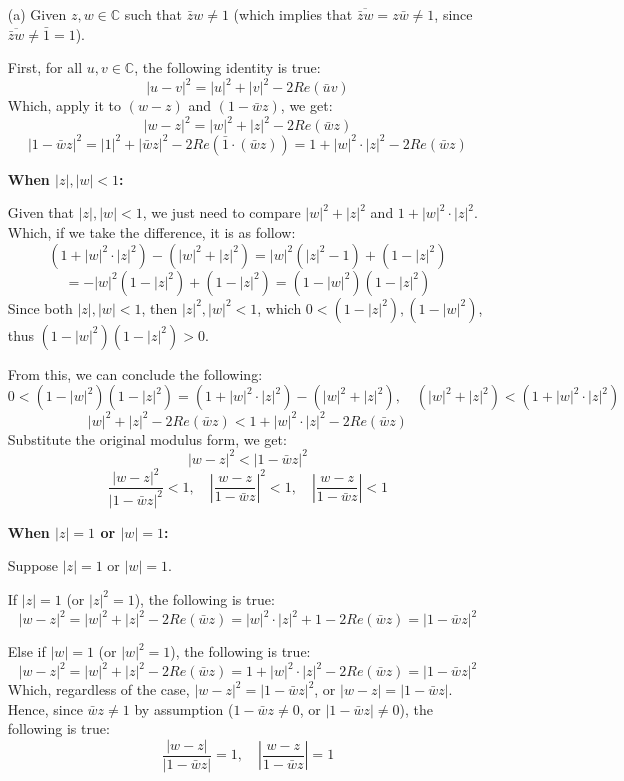 \documentclass{article}
\begin{document}
\begin{itemize}
    \item[(a)]
    Given $z,w\in\mathbb{C}$ such that $\bar{z}w\neq 1$ (which implies that $\overline{\bar{z}w}=z\bar{w}\neq 1$, since $\overline{\bar{z}w}\neq\bar{1}=1$).

    First, for all $u,v\in\mathbb{C}$, the following identity is true:
    $$|u-v|^2 = |u|^2+|v|^2-2Re(\bar{u}v)$$
    Which, apply it to $(w-z)$ and $(1-\bar{w}z)$, we get:
    $$|w-z|^2 = |w|^2+|z|^2 - 2Re(\bar{w}z)$$
    $$|1-\bar{w}z|^2=|1|^2+|\bar{w}z|^2 - 2Re(\bar{1}\cdot(\bar{w}z)) = 1+|w|^2\cdot|z|^2-2Re(\bar{w}z)$$

    \hfill

    \textbf{When $|z|,|w| <1$:}
    
    Given that $|z|,|w|<1$, we just need to compare $|w|^2+|z|^2$ and $1+|w|^2\cdot |z|^2$. Which, if we take the difference, it is as follow:
    $$(1+|w|^2\cdot|z|^2)-(|w|^2+|z|^2) = |w|^2(|z|^2-1) + (1-|z|^2)$$
    $$= -|w|^2(1-|z|^2)+(1-|z|^2) = (1-|w|^2)(1-|z|^2)$$
    Since both $|z|,|w|<1$, then $|z|^2,|w|^2<1$, which $0 < (1-|z|^2), (1-|w|^2)$, thus $(1-|w|^2)(1-|z|^2) >0$.

    From this, we can conclude the following:
    $$0<(1-|w|^2)(1-|z|^2)=(1+|w|^2\cdot|z|^2)-(|w|^2+|z|^2),\quad(|w|^2+|z|^2) < (1+|w|^2\cdot|z|^2)$$
    $$|w|^2+|z|^2-2Re(\bar{w}z) < 1+|w|^2\cdot|z|^2-2Re(\bar{w}z)$$
    Substitute the original modulus form, we get:
    $$|w-z|^2 < |1-\bar{w}z|^2$$
    $$\frac{|w-z|^2}{|1-\bar{w}z|^2}<1,\quad \left|\frac{w-z}{1-\bar{w}z}\right|^2<1,\quad \left|\frac{w-z}{1-\bar{w}z}\right|<1$$
    
    \hfill

    \textbf{When $|z|=1$ or $|w|=1$:}

    Suppose $|z|=1$ or $|w|=1$.

    If $|z|=1$ (or $|z|^2=1$), the following is true:
    $$|w-z|^2 = |w|^2+|z|^2 - 2Re(\bar{w}z) = |w|^2\cdot|z|^2+1-2Re(\bar{w}z) = |1-\bar{w}z|^2$$

    Else if $|w|=1$ (or $|w|^2=1$), the following is true:
    $$|w-z|^2 = |w|^2+|z|^2 - 2Re(\bar{w}z) = 1+|w|^2\cdot|z|^2-2Re(\bar{w}z) = |1-\bar{w}z|^2$$
    Which, regardless of the case, $|w-z|^2 = |1-\bar{w}z|^2$, or $|w-z| = |1-\bar{w}z|$. Hence, since $\bar{w}z \neq 1$ by assumption ($1-\bar{w}z\neq 0$, or $|1-\bar{w}z|\neq 0$), the following is true:
    $$\frac{|w-z|}{|1-\bar{w}z|} = 1,\quad \left|\frac{w-z}{1-\bar{w}z}\right|=1$$

    \hfill
    

\end{itemize}
\end{document}

